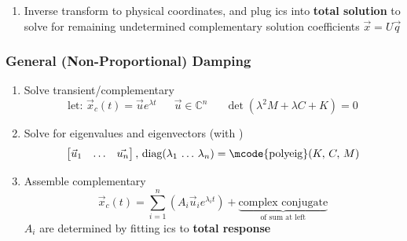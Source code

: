 \documentclass[twocolumn, 12pt]{article}    %
\begin{document}
\begin{enumerate}
    \item Inverse transform to physical coordinates, and plug ics into \textbf{total solution} to solve for remaining undetermined complementary solution coefficients \(\vec{x} = U\vec{q}\)
\end{enumerate}

\subsubsection*{General (Non-Proportional) Damping}
\begin{enumerate}
    \item Solve transient/complementary 
    \begin{equation*}
        \text{let: } \vec{x}_c(t) = \vec{u} e^{\lambda t} \hspace{19pt} \vec{u} \in \mathds{C}^n \hspace{19pt} \det (\lambda^2 M + \lambda C + K) = 0
    \end{equation*}

    \item Solve for eigenvalues and eigenvectors (with ) 
    \begin{equation*}
        \begin{bmatrix}
            \vec{u}_1 & \dots & \vec{u_n}
        \end{bmatrix},\, \text{diag} (\lambda_1\, \dots \,\lambda_n) = \text{\mcode{polyeig}}(K, \,C,\, M)
    \end{equation*}
    \item Assemble complementary
    \begin{equation*}
        \vec{x}_c(t) = \sum_{i=1}^n \left( A_i \vec{u}_ie^{\lambda_i t}\right) + \underbrace{\text{complex conjugate}}_{\text{of sum at left}}
    \end{equation*}
    \(A_i\) are determined by fitting ics to \textbf{total response}


\end{enumerate}
\end{document}

